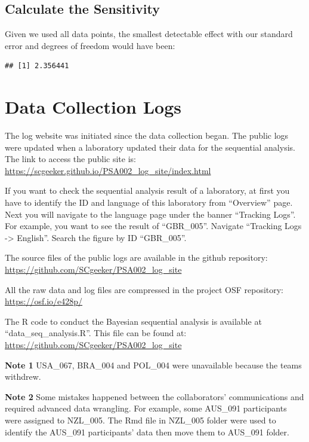 \documentclass[
  man,floatsintext]{apa7}
\begin{document}
\hypertarget{calculate-the-sensitivity}{%
\subsection{Calculate the Sensitivity}\label{calculate-the-sensitivity}}

Given we used all data points, the smallest detectable effect with our standard error and degrees of freedom would have been:

\begin{verbatim}
## [1] 2.356441
\end{verbatim}

\hypertarget{data-collection-logs}{%
\section{Data Collection Logs}\label{data-collection-logs}}

The log website was initiated since the data collection began. The public logs were updated when a laboratory updated their data for the sequential analysis. The link to access the public site is: \url{https://scgeeker.github.io/PSA002_log_site/index.html}

If you want to check the sequential analysis result of a laboratory, at first you have to identify the ID and language of this laboratory from ``Overview'' page. Next you will navigate to the language page under the banner ``Tracking Logs''. For example, you want to see the result of ``GBR\_005''. Navigate ``Tracking Logs -\textgreater{} English''. Search the figure by ID ``GBR\_005''.

The source files of the public logs are available in the github repository:
\url{https://github.com/SCgeeker/PSA002_log_site}

All the raw data and log files are compressed in the project OSF repository: \url{https://osf.io/e428p/}

The R code to conduct the Bayesian sequential analysis is available at ``data\_seq\_analysis.R''. This file can be found at: \url{https://github.com/SCgeeker/PSA002_log_site}

\textbf{Note 1} USA\_067, BRA\_004 and POL\_004 were unavailable because the teams withdrew.

\textbf{Note 2} Some mistakes happened between the collaborators' communications and required advanced data wrangling. For example, some AUS\_091 participants were assigned to NZL\_005. The Rmd file in NZL\_005 folder were used to identify the AUS\_091 participants' data then move them to AUS\_091 folder.
\end{document}
